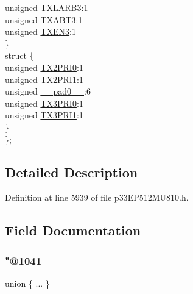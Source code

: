 \begin{DoxyCompactItemize}
\begin{tabbing}
\>\>unsigned \hyperlink{structtag_c2_t_r23_c_o_n_b_i_t_s_ad6e8611b390790bb11e348fb7d62807b}{TXLARB3}:1\\
\>\>unsigned \hyperlink{structtag_c2_t_r23_c_o_n_b_i_t_s_ac69208cdc9f415f7aeb25c382679da30}{TXABT3}:1\\
\>\>unsigned \hyperlink{structtag_c2_t_r23_c_o_n_b_i_t_s_aaf25622f65dc89d420053ec650bc9635}{TXEN3}:1\\
\>\} \\
\>struct \{\\
\>\>unsigned \hyperlink{structtag_c2_t_r23_c_o_n_b_i_t_s_a7d03ca8b5705b55da0b6702ec0001d08}{TX2PRI0}:1\\
\>\>unsigned \hyperlink{structtag_c2_t_r23_c_o_n_b_i_t_s_ab62b5330890052fa3c5d72d7a2535faa}{TX2PRI1}:1\\
\>\>unsigned \hyperlink{structtag_c2_t_r23_c_o_n_b_i_t_s_adf71f3d8410c1f1dbbc96680a92c49af}{\_\_pad0\_\_}:6\\
\>\>unsigned \hyperlink{structtag_c2_t_r23_c_o_n_b_i_t_s_ada6b9c6a4931f1d7b7fc7ab3eb06a813}{TX3PRI0}:1\\
\>\>unsigned \hyperlink{structtag_c2_t_r23_c_o_n_b_i_t_s_a319e696565d0e4a56de2f6e584c59c63}{TX3PRI1}:1\\
\>\} \\
\}; \\

\end{tabbing}\end{DoxyCompactItemize}


\subsection{Detailed Description}


Definition at line 5939 of file p33\+E\+P512\+M\+U810.\+h.



\subsection{Field Documentation}
\mbox{\label{structtag_c2_t_r23_c_o_n_b_i_t_s_a548a86d924ea25f85c111ba1902ae36e}} 
\subsubsection{\texorpdfstring{"@1041}{@1041}}
{\footnotesize\ttfamily union \{ ... \} }

\mbox{\label{structtag_c2_t_r23_c_o_n_b_i_t_s_adf71f3d8410c1f1dbbc96680a92c49af}} 
